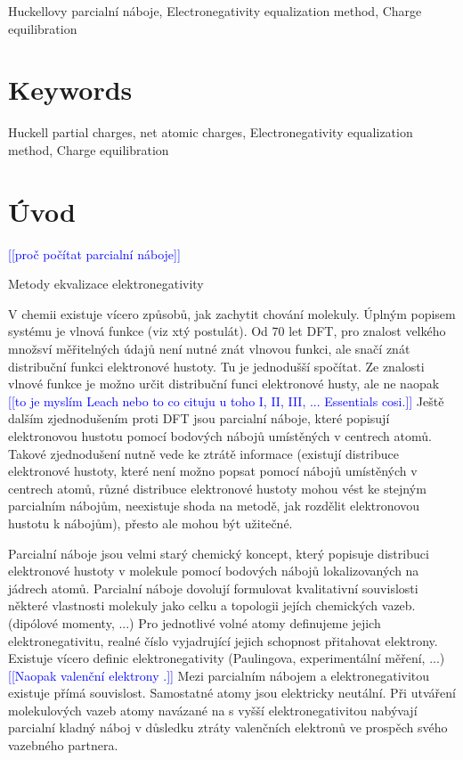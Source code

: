 \documentclass[10pt,draft,oneside]{fithesis2}
\newcommand\todo[1]{\textcolor{blue}{[[#1]]}}
\begin{document}
\begin{ThesisKeyWords}
Huckellovy parcialní náboje, Electronegativity equalization method, Charge equilibration

\begingroup
\let\clearpage\relax
{}
\chapter*{Keywords}
\endgroup

Huckell partial charges, net atomic charges, Electronegativity equalization method, Charge equilibration
\end{ThesisKeyWords}

\MainMatter


\tableofcontents

\chapter*{Úvod}

\todo{proč počítat parcialní náboje}

Metody ekvalizace elektronegativity

V chemii existuje vícero způsobů, jak zachytit chování molekuly. Úplným popisem systému je vlnová funkce (viz xtý postulát). Od 70 let DFT, pro znalost velkého množsví měřitelných údajů není nutné znát vlnovou funkci, ale snačí znát distribuční funkci elektronové hustoty. Tu je jednodušší spočítat. Ze znalosti vlnové funkce je možno určit distribuční funci elektronové husty, ale ne naopak \todo{to je myslím Leach nebo to co cituju u toho I, II, III, ... Essentials cosi.} Ještě dalším zjednodušením proti DFT jsou parcialní náboje, které popisují elektronovou hustotu pomocí bodových nábojů umístěných v centrech atomů. Takové zjednodušení nutně vede ke ztrátě informace (existují distribuce elektronové hustoty, které není možno popsat pomocí nábojů umístěných v centrech atomů, různé distribuce elektronové hustoty mohou vést ke stejným parcialním nábojům, neexistuje shoda na metodě, jak rozdělit elektronovou hustotu k nábojům), přesto ale mohou být užitečné.

Parcialní náboje jsou velmi starý chemický koncept, který popisuje distribuci elektronové hustoty v molekule pomocí bodových nábojů lokalizovaných na jádrech atomů. Parcialní náboje dovolují formulovat kvalitativní souvislosti některé vlastnosti molekuly jako celku a topologii jejích chemických vazeb. (dipólové momenty, ...) Pro jednotlivé volné atomy definujeme jejich elektronegativitu, realné číslo vyjadrující jejich schopnost přitahovat elektrony. Existuje vícero definic elektronegativity (Paulingova, experimentální měření, ...)  \todo{Naopak valenční elektrony .} Mezi parcialním nábojem a elektronegativitou existuje přímá souvislost. Samostatné atomy jsou elektricky neutální. Při utváření molekulových vazeb atomy navázané na s vyšší elektronegativitou nabývají parcialní kladný náboj v důsledku ztráty valenčních elektronů ve prospěch svého vazebného partnera.
\end{document}
